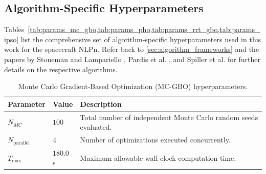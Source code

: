 \subsection{Algorithm-Specific Hyperparameters}
Tables~\cref{tab:params_mc_gbo,tab:params_pho,tab:params_rrt_gbo,tab:params_ipso} list the comprehensive set of algorithm-specific hyperparameters used in this work for the spacecraft \ac{NLPn}.
Refer back to \cref{sec:algorithm_frameworks} and the papers by Stoneman and Lampariello \cite{Stoneman14}, Pardis et al. \cite{Pardis24}, and Spiller et al. \cite{Spiller16,Spiller18} for further details on the respective algorithms.

\begin{table}[htbp]
    \centering
    \caption{Monte Carlo Gradient-Based Optimization (MC-GBO) hyperparameters.}
    \label{tab:params_mc_gbo}
    \begin{tabularx}{\textwidth}{l l X}
        \toprule
        \textbf{Parameter} & \textbf{Value} & \textbf{Description} \\
        \midrule
        $N_{MC}$ & $100$ & Total number of independent Monte Carlo random seeds evaluated. \\
        $N_{\text{parallel}}$ & $4$ & Number of optimizations executed concurrently. \\
        $T_{\max}$ & $180.0$\,s & Maximum allowable wall-clock computation time. \\
        \bottomrule
    \end{tabularx}
\end{table}

